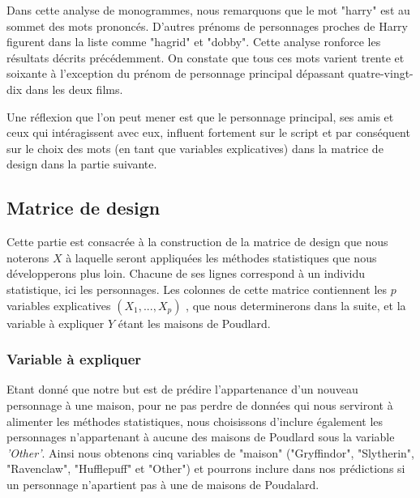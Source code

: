 \documentclass[11pt]{article}
\begin{document}
\begin{center}
Dans cette analyse de monogrammes, nous remarquons que le mot "harry" est au sommet des mots prononcés. D'autres prénoms de personnages proches de Harry figurent dans la liste comme "hagrid" et "dobby". Cette analyse ronforce les résultats décrits précédemment.
On constate que tous ces mots varient trente et soixante à l'exception du prénom de personnage principal dépassant quatre-vingt-dix dans les deux films.\par

Une réflexion que l'on peut mener est que le personnage principal, ses amis et ceux qui intéragissent avec eux, influent fortement sur le script et par conséquent sur le choix des mots (en tant que variables explicatives) dans la matrice de design dans la partie suivante.

\subsection{Matrice de design}

Cette partie est consacrée à la construction de la matrice de design que nous noterons $X$ à laquelle seront appliquées les méthodes statistiques que nous développerons plus loin. Chacune de ses lignes correspond à un individu statistique, ici les personnages. Les colonnes de cette matrice contiennent les $p$ variables explicatives $(X_{1},...,X_{p})$  , que nous determinerons dans la suite, et la variable à expliquer $Y$ étant les maisons de Poudlard.\par

\subsubsection{Variable à expliquer}

Etant donné que notre but est de prédire l'appartenance d'un nouveau personnage à une maison, pour ne pas perdre de données qui nous serviront à alimenter les méthodes statistiques, nous choisissons d'inclure également les personnages n'appartenant à aucune des maisons de Poudlard sous la variable \textit{'Other'}. Ainsi nous obtenons cinq variables de "maison" ("Gryffindor", "Slytherin", "Ravenclaw", "Hufflepuff" et "Other") et pourrons inclure dans nos prédictions si un personnage n'apartient pas à une de maisons de Poudalard.\par

\newpage


\end{center}
\end{document}
